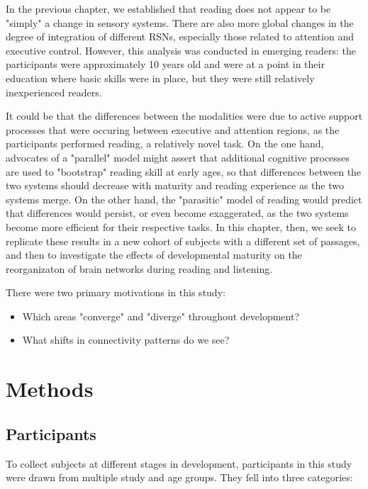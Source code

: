In the previous chapter, we established that reading does not appear to be "simply" a change in sensory systems. There are also more global changes in the degree of integration of different RSNs, especially those related to attention and executive control. However, this analysis was conducted in emerging readers: the participants were approximately 10 years old and were at a point in their education where basic skills were in place, but they were still relatively inexperienced readers.

It could be that the differences between the modalities were due to active support processes that were occuring between executive and attention regions, as the participants performed reading, a relatively novel task. On the one hand, advocates of a "parallel" model might assert that additional cognitive processes are used to "bootstrap" reading skill at early ages, so that differences between the two systems should decrease with maturity and reading experience as the two systems merge. On the other hand, the "parasitic" model of reading would predict that differences would persist, or even become exaggerated, as the two systems become more efficient for their respective tasks. In this chapter, then, we seek to replicate these results in a new cohort of subjects with a different set of passages, and then to investigate the effects of developmental maturity on the reorganizaton of brain networks during reading and listening.

There were two primary motivations in this study:

\begin{itemize}
	\item Which areas "converge" and "diverge" throughout development?
	\item What shifts in connectivity patterns do we see?
\end{itemize} 

\section{Methods}

\subsection{Participants}

To collect subjects at different stages in development, participants in this study were drawn from multiple study and age groups. They fell into three categories:

